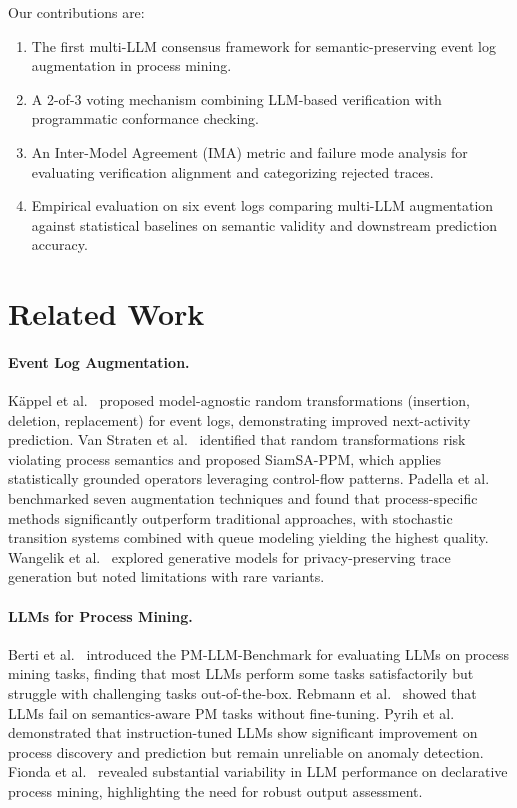 \documentclass[11pt,a4paper]{article}
\begin{document}
Our contributions are:
\begin{enumerate}
    \item The first multi-LLM consensus framework for semantic-preserving event log augmentation in process mining.
    \item A 2-of-3 voting mechanism combining LLM-based verification with programmatic conformance checking.
    \item An Inter-Model Agreement (IMA) metric and failure mode analysis for evaluating verification alignment and categorizing rejected traces.
    \item Empirical evaluation on six event logs comparing multi-LLM augmentation against statistical baselines on semantic validity and downstream prediction accuracy.
\end{enumerate}


\section{Related Work}

\paragraph{Event Log Augmentation.}
K\"{a}ppel et al.~\cite{kappel2023modelagnostic} proposed model-agnostic random transformations (insertion, deletion, replacement) for event logs, demonstrating improved next-activity prediction. Van Straten et al.~\cite{vanstraten2025siamsa} identified that random transformations risk violating process semantics and proposed SiamSA-PPM, which applies statistically grounded operators leveraging control-flow patterns. Padella et al.~\cite{padella2025comparison} benchmarked seven augmentation techniques and found that process-specific methods significantly outperform traditional approaches, with stochastic transition systems combined with queue modeling yielding the highest quality. Wangelik et al.~\cite{wangelik2025differential} explored generative models for privacy-preserving trace generation but noted limitations with rare variants.

\paragraph{LLMs for Process Mining.}
Berti et al.~\cite{berti2024pmllm} introduced the PM-LLM-Benchmark for evaluating LLMs on process mining tasks, finding that most LLMs perform some tasks satisfactorily but struggle with challenging tasks out-of-the-box. Rebmann et al.~\cite{rebmann2024evaluating} showed that LLMs fail on semantics-aware PM tasks without fine-tuning. Pyrih et al.~\cite{pyrih2025instruction} demonstrated that instruction-tuned LLMs show significant improvement on process discovery and prediction but remain unreliable on anomaly detection. Fionda et al.~\cite{fionda2025declarative} revealed substantial variability in LLM performance on declarative process mining, highlighting the need for robust output assessment.
\end{document}
